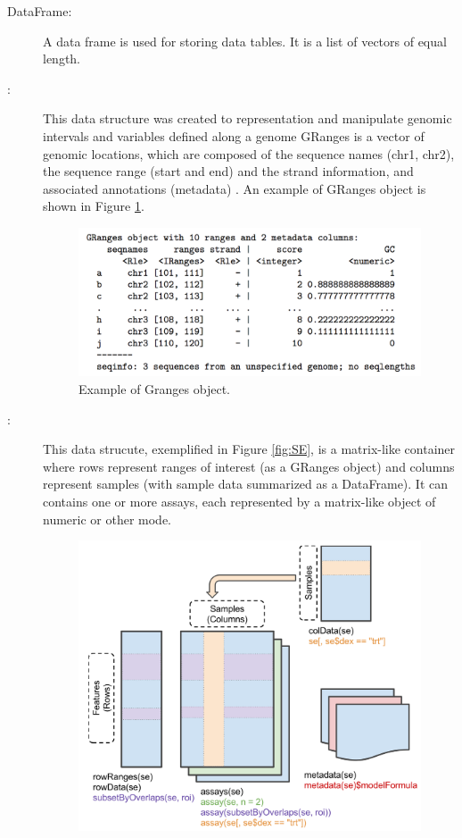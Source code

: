 \begin{description}
  \item [DataFrame:] A data frame is used for storing data tables. It is a list of vectors of equal length.
  \item [:] This data structure was created to representation and manipulate genomic intervals and variables defined along a genome
  GRanges is a vector of genomic locations, which are composed of the sequence names (chr1, chr2), the sequence range (start and end) and the strand information, and associated annotations (metadata) \cite{lawrence2013software}. An example of GRanges object is shown in Figure \ref{fig:granges}.

  \begin{figure}[ht!]
  \centering
  \includegraphics[width=1.0\textwidth]{images/Granges.png}
  \caption[Granges object]{\label{fig:granges} Example of Granges object.}
  \end{figure}
  \item [:]  This data strucute, exemplified in Figure \ref{fig:SE}, is a  matrix-like container where rows represent ranges of interest (as a GRanges object) and columns represent samples (with sample data summarized as a DataFrame). It can contains one or more assays, each represented by a matrix-like object of numeric or other mode.
  \begin{figure}[ht!]
  \centering
  \includegraphics[width=1.0\textwidth]{images/summarizedExperiment.png}

\end{figure}
\end{description}
